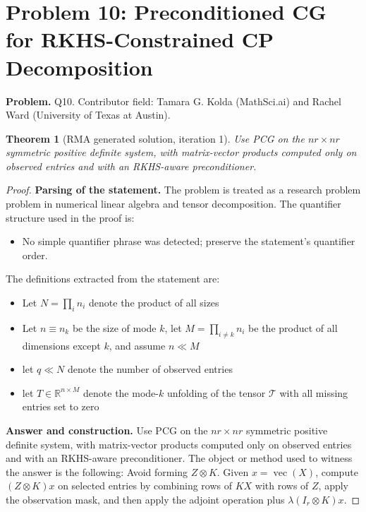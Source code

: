 \documentclass[11pt]{article}
\newtheorem{theorem}{Theorem}
\begin{document}
\section*{Problem 10: Preconditioned CG for RKHS-Constrained CP Decomposition}

\noindent\textbf{Problem.} Q10. Contributor field: Tamara G. Kolda (MathSci.ai) and Rachel Ward (University of Texas at Austin).

\begin{theorem}[RMA generated solution, iteration 1]
Use PCG on the \(nr\times nr\) symmetric positive definite system, with matrix-vector products computed only on observed entries and with an RKHS-aware preconditioner.
\end{theorem}

\begin{proof}
\textbf{Parsing of the statement.}
The problem is treated as a research problem problem in numerical linear algebra and tensor decomposition.
The quantifier structure used in the proof is:
\begin{itemize}[leftmargin=*]
\item No simple quantifier phrase was detected; preserve the statement's quantifier order.
\end{itemize}
The definitions extracted from the statement are:
\begin{itemize}[leftmargin=*]
\item Let $N = \prod_i n_i$ denote the product of all sizes
\item Let $n \equiv n_k$ be the size of mode $k$, let $M = \prod_{i\neq k} n_i$ be the product of all dimensions except $k$, and assume $n \ll M$
\item let $q \ll N$ denote the number of observed entries
\item let $T \in \mathbb{R}^{n \times M}$ denote the mode-$k$ unfolding of the tensor $\mathcal{T}$ with all missing entries set to zero
\end{itemize}

\textbf{Answer and construction.}
Use PCG on the \(nr\times nr\) symmetric positive definite system, with matrix-vector products computed only on observed entries and with an RKHS-aware preconditioner. The object or method used to witness the answer is the
following: Avoid forming \(Z\otimes K\). Given \(x=\operatorname{vec}(X)\), compute \((Z\otimes K)x\) on selected entries by combining rows of \(KX\) with rows of \(Z\), apply the observation mask, and then apply the adjoint operation plus \(\lambda(I_r\otimes K)x\).


\end{proof}
\end{document}
